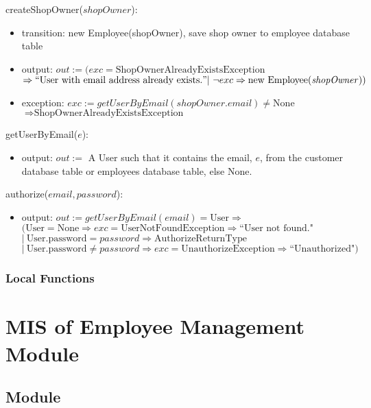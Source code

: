 \documentclass[12pt, titlepage]{article}
\begin{document}
\noindent createShopOwner($shopOwner$):
\begin{itemize}
	\item transition: new Employee(shopOwner), save shop owner to employee database table
	\item output: $out := (exc = \text{ShopOwnerAlreadyExistsException}$ \\ $\Rightarrow ``\text{User with
			      email address already exists.}" |\ \neg exc \Rightarrow \text{new Employee(\emph{shopOwner})})$
	\item exception: $exc := getUserByEmail(shopOwner.email) \neq \text{None}$ \\ $\Rightarrow
		      \text{ShopOwnerAlreadyExistsException}$
\end{itemize}

\noindent getUserByEmail($e$):
\begin{itemize}
	\item output: $out :=$ A User such that it contains the email, $e$, from the customer database table or
	      employees database table, else None.
\end{itemize}

\noindent authorize($email, password$):
\begin{itemize}
	\item output: $out := getUserByEmail(email) = \text{User} \Rightarrow $ \\ $(\text{User} = \text{None}
		      \Rightarrow exc = \text{UserNotFoundException} \Rightarrow \text{``User not found."}$ \\ $|\
		      \text{User.password} = password \Rightarrow \text{AuthorizeReturnType}$ \\ $|\ \text{User.password}
		      \neq password \Rightarrow exc = \text{UnauthorizeException} \Rightarrow \text{``Unauthorized"})$
\end{itemize}

\subsubsection{Local Functions}

\newpage

\section{MIS of Employee Management Module} \label{mEmployeeManagement}
\subsection{Module}
\end{document}
